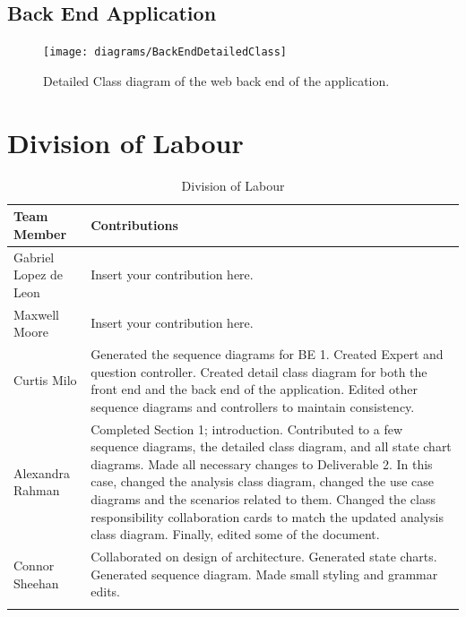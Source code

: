 \documentclass[titlepage]{article}
\begin{document}
\subsection{Back End Application}
\begin{figure}[H]
\texttt{[image: diagrams/BackEndDetailedClass]}
\caption{Detailed Class diagram of the web back end of the application.}\label{sd:web_application}
\end{figure}

\pagebreak
\appendix
\section{Division of Labour}
\label{sec:division_of_labour}

\begin{longtable}{| p{} | p{} |}
			\hline
			\textbf {Team Member} & \textbf{Contributions}\\ 
			\hline
			Gabriel Lopez de Leon & Insert your contribution here.
			\\
			\hline
			Maxwell Moore & Insert your contribution here.
			\\
			\hline
			Curtis Milo & Generated the sequence diagrams for BE 1. Created Expert and question controller. Created detail class diagram for both the front end and the back end of the application. Edited other sequence diagrams and controllers to maintain consistency.
			\\ 
			\hline
			Alexandra Rahman & Completed Section 1; introduction. Contributed to a few sequence diagrams, the detailed class diagram, and all state chart diagrams. Made all necessary changes to Deliverable 2. In this case, changed the analysis class diagram, changed the use case diagrams and the scenarios related to them. Changed the class responsibility collaboration cards to match the updated analysis class diagram. Finally, edited some of the document.
			\\
			\hline
			Connor Sheehan & Collaborated on design of architecture. Generated state charts. Generated sequence diagram. Made small styling and grammar edits.
			\\
			\hline
			
			\caption{Division of Labour}
	\end{longtable}
\end{document}

